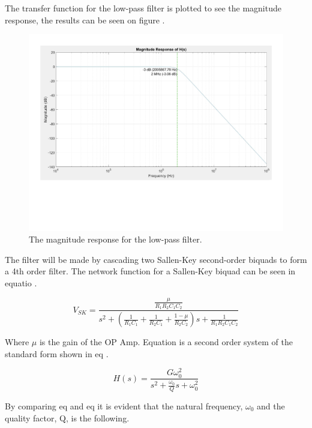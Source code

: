 The transfer function for the low-pass filter is plotted to see the magnitude response, the results can be seen on figure .
\begin{figure}[H]
    \centering
    \includegraphics[clip, trim=0 150 0 0, width=1\textwidth]{Sections/7_SystemDesign/Figures/7_2_4_AAFILT_HS.pdf}
    \caption{The magnitude response for the low-pass filter.}
    \label{fig_7_1_4_MAGRESP}
\end{figure}

The filter will be made by cascading two Sallen-Key second-order biquads to form a 4th order filter. The network function for a Sallen-Key biquad can be seen in equatio  \cite{ANALOGFILTERS}.

\begin{equation}\label{eq:7_1_4_SallenKeyTF}
    V_{SK} = \frac{  \frac{\mu}{R_1R_2C_1C_2}}{s^2 + (\frac{1}{R_1C_1} + \frac{1}{R_2C_1} + \frac{1 - \mu}{R_2C_2})s + \frac{1}{R_1R_2C_1C_2}}
\end{equation}

Where $\mu$ is the gain of the OP Amp. Equation  is a second order system of the standard form shown in eq .

\begin{equation}\label{eq:7_1_4_SecondOrderSystem}
   H(s) = \frac{G\omega_0^2}{s^2 + \frac{\omega_0}{Q}s + \omega_0^2}
\end{equation}

By comparing eq  and eq  it is evident that the natural frequency, $\omega_0$ and the quality factor, Q, is the following.

